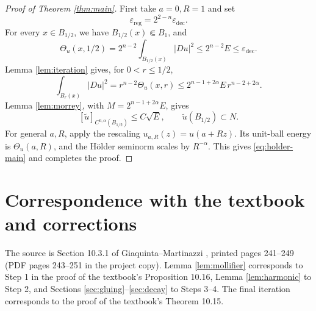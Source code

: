 \documentclass[11pt,a4paper]{article}
\numberwithin{equation}{section}
\theoremstyle{definition}
\newcommand{\Th}{\Theta}
\begin{document}
\begin{proof}[Proof of Theorem \ref{thm:main}]
First take $a=0,R=1$ and set
\begin{equation}\label{eq:threshold-main}
\varepsilon_{\mathrm{reg}}=2^{2-n}\varepsilon_{\mathrm{dec}}.
\end{equation}
For every $x\in B_{1/2}$, we have $B_{1/2}(x)\Subset B_1$, and
\[
\Th_u(x,1/2)=2^{n-2}\int_{B_{1/2}(x)}|Du|^2
\le2^{n-2}E\le\varepsilon_{\mathrm{dec}}.
\]
Lemma \ref{lem:iteration} gives, for $0<r\le1/2$,
\[
\int_{B_r(x)}|Du|^2
=r^{n-2}\Th_u(x,r)
\le2^{n-1+2\alpha}E\,r^{n-2+2\alpha}.
\]
Lemma \ref{lem:morrey}, with $M=2^{n-1+2\alpha}E$, gives
\[
[\widetilde u]_{C^{0,\alpha}(B_{1/2})}\le C\sqrt E,
\qquad\widetilde u(B_{1/2})\subset N.
\]
For general $a,R$, apply the rescaling $u_{a,R}(z)=u(a+Rz)$. Its unit-ball energy is $\Th_u(a,R)$, and the Hölder seminorm scales by $R^{-\alpha}$. This gives \eqref{eq:holder-main} and completes the proof.
\end{proof}

\section{Correspondence with the textbook and corrections}

The source is Section 10.3.1 of Giaquinta--Martinazzi \cite{GM}, printed pages 241--249 (PDF pages 243--251 in the project copy). Lemma \ref{lem:mollifier} corresponds to Step 1 in the proof of the textbook's Proposition 10.16, Lemma \ref{lem:harmonic} to Step 2, and Sections \ref{sec:gluing}--\ref{sec:decay} to Steps 3--4. The final iteration corresponds to the proof of the textbook's Theorem 10.15.
\end{document}

